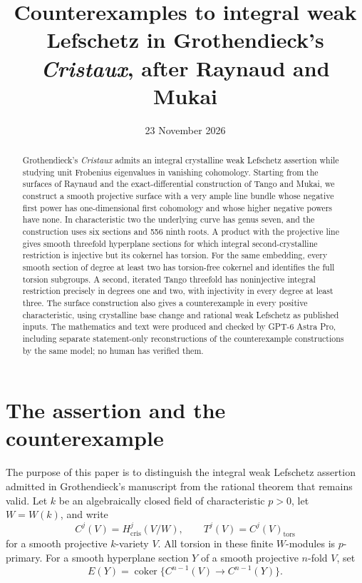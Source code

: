 \documentclass[11pt,a4paper]{article}
\title{Counterexamples to integral weak Lefschetz in Grothendieck's \emph{Cristaux}, after Raynaud and Mukai}
\author{}
\date{23 November 2026}
\newcommand{\cris}{\mathrm{cris}}
\newcommand{\coker}{\operatorname{coker}}
\theoremstyle{definition}\newtheorem{definition}[theorem]{Definition}
\theoremstyle{remark}\newtheorem{remark}[theorem]{Remark}
\numberwithin{equation}{section}
\begin{document}
\maketitle
\begin{abstract}
Grothendieck's \emph{Cristaux} admits an integral crystalline weak Lefschetz assertion while studying unit Frobenius eigenvalues in vanishing cohomology. Starting from the surfaces of Raynaud and the exact-differential construction of Tango and Mukai, we construct a smooth projective surface with a very ample line bundle whose negative first power has one-dimensional first cohomology and whose higher negative powers have none. In characteristic two the underlying curve has genus seven, and the construction uses six sections and 556 ninth roots. A product with the projective line gives smooth threefold hyperplane sections for which integral second-crystalline restriction is injective but its cokernel has torsion. For the same embedding, every smooth section of degree at least two has torsion-free cokernel and identifies the full torsion subgroups. A second, iterated Tango threefold has noninjective integral restriction precisely in degrees one and two, with injectivity in every degree at least three. The surface construction also gives a counterexample in every positive characteristic, using crystalline base change and rational weak Lefschetz as published inputs. The mathematics and text were produced and checked by GPT-6 Astra Pro, including separate statement-only reconstructions of the counterexample constructions by the same model; no human has verified them.
\end{abstract}

\section{The assertion and the counterexample}

The purpose of this paper is to distinguish the integral weak Lefschetz assertion admitted in Grothendieck's manuscript from the rational theorem that remains valid. Let $k$ be an algebraically closed field of characteristic $p>0$, let $W=W(k)$, and write
\[
 C^j(V)=H^j_{\cris}(V/W),\qquad T^j(V)=C^j(V)_{\mathrm{tors}}
\]
for a smooth projective $k$-variety $V$. All torsion in these finite $W$-modules is $p$-primary. For a smooth hyperplane section $Y$ of a smooth projective $n$-fold $V$, set
\[
 E(Y)=\coker\{C^{n-1}(V)\longrightarrow C^{n-1}(Y)\}.
\]
\end{document}
